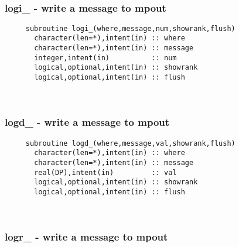  
\mbox{}\hrulefill\ 

  \subsubsection{logi\_ - write a message to mpout}

\begin{verbatim} 
     subroutine logi_(where,message,num,showrank,flush)
       character(len=*),intent(in) :: where
       character(len=*),intent(in) :: message
       integer,intent(in)          :: num
       logical,optional,intent(in) :: showrank
       logical,optional,intent(in) :: flush
 \end{verbatim}%
 
 
\mbox{}\hrulefill\ 

  \subsubsection{logd\_ - write a message to mpout}

\begin{verbatim} 
     subroutine logd_(where,message,val,showrank,flush)
       character(len=*),intent(in) :: where
       character(len=*),intent(in) :: message
       real(DP),intent(in)         :: val
       logical,optional,intent(in) :: showrank
       logical,optional,intent(in) :: flush
 \end{verbatim}%
 
 
\mbox{}\hrulefill\ 
 
  \subsubsection{logr\_ - write a message to mpout}

